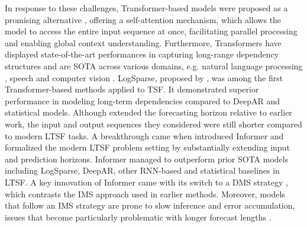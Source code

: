 \documentclass[a4paper,oneside,bibliography=totoc]{scrbook}
\begin{document}
\noindent
In response to these challenges, Transformer-based models \cite{vaswani_attention_2017} were proposed as a promising alternative \cite{zhou_informer_2021, li_enhancing_2019}, offering a self-attention mechanism, which allows the model to access the entire input sequence at once, facilitating parallel processing and enabling global context understanding. 
Furthermore, Transformers have displayed state-of-the-art performances in capturing long-range dependency structures \cite{wen_transformers_2023} and are SOTA across various domains, e.g. natural language processing \cite{brown_language_2020}, speech \cite{kim_squeezeformer_2022} and computer vision \cite{dosovitskiy_image_2021}.
LogSparse, proposed by \citet{li_enhancing_2019}, was among the first Transformer-based methods applied to TSF. It demonstrated superior performance in modeling long-term dependencies compared to DeepAR and statistical models.
Although \citet{li_enhancing_2019} extended the forecasting horizon relative to earlier work, the input and output sequences they considered were still shorter compared to modern LTSF tasks.
A breakthrough came when \citet{zhou_informer_2021} introduced Informer and formalized the modern LTSF problem setting by substantially extending input and prediction horizons. 
Informer managed to outperform prior SOTA models including LogSparse, DeepAR, other RNN-based and statistical baselines in LTSF. 
A key innovation of Informer came with its switch to a DMS strategy \cite{zeng_are_2023}, which contrasts the IMS approach used in earlier methods. Moreover, models that follow an IMS strategy are prone to slow inference and error accumulation, issues that become particularly problematic with longer forecast lengths \cite{zhou_informer_2021}.
\newline
\end{document}
